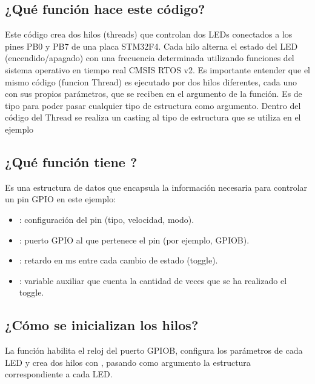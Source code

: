 \documentclass[letterpaper,10pt,english]{sphinxmanual}
\begin{document}
\subsection{¿Qué función hace este código?}
\label{\detokenize{ejemplothreads:que-funcion-hace-este-codigo}}
\sphinxAtStartPar
Este código crea dos hilos (threads) que controlan dos LEDs conectados a los pines PB0 y PB7 de una placa STM32F4. Cada hilo alterna el estado del LED (encendido/apagado) con una frecuencia determinada utilizando funciones del sistema operativo en tiempo real CMSIS RTOS v2.
Es importante entender que el mismo código (funcion Thread) es ejecutado por dos hilos diferentes, cada uno con sus propios parámetros, que se reciben en el argumento de la función.
Es de tipo  para poder pasar cualquier tipo de estructura como argumento. Dentro del código del Thread se realiza un casting al tipo de estructura que se utiliza en el ejemplo


\subsection{¿Qué  función tiene ?}
\label{\detokenize{ejemplothreads:que-funcion-tiene-mygpio-pin}}
\sphinxAtStartPar
Es una estructura de datos que encapsula la información necesaria para controlar un pin GPIO en este ejemplo:
\begin{itemize}
\item {} 
\sphinxAtStartPar
{}: configuración del pin (tipo, velocidad, modo).

\item {} 
\sphinxAtStartPar
{}: puerto GPIO al que pertenece el pin (por ejemplo, GPIOB).

\item {} 
\sphinxAtStartPar
{}: retardo en ms entre cada cambio de estado (toggle).

\item {} 
\sphinxAtStartPar
{}: variable auxiliar que cuenta la cantidad de veces que se ha realizado el toggle.

\end{itemize}


\subsection{¿Cómo se inicializan los hilos?}
\label{\detokenize{ejemplothreads:como-se-inicializan-los-hilos}}
\sphinxAtStartPar
La función  habilita el reloj del puerto GPIOB, configura los parámetros de cada LED y crea dos hilos con , pasando como argumento la estructura  correspondiente a cada LED.
\end{document}
